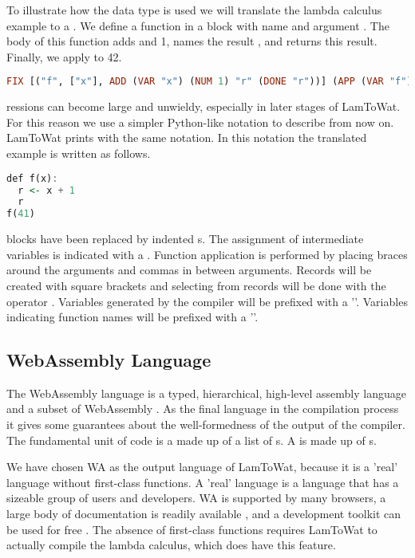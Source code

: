 {To illustrate how the data type is used we will translate the lambda calculus example  to a . We define a function in a  block with name  and argument . The body of this function adds  and 1, names the result , and returns this result. Finally, we apply  to 42.

\begin{lstlisting}[language=Haskell]
  FIX [("f", ["x"], ADD (VAR "x") (NUM 1) "r" (DONE "r"))] (APP (VAR "f") [NUM 41])
\end{lstlisting}

ressions can become large and unwieldy, especially in later stages of LamToWat. For this reason we use a simpler Python-like notation to describe  from now on. LamToWat prints  with the same notation. In this notation the translated example is written as follows.

\begin{lstlisting}[language=Haskell]
def f(x):
  r <- x + 1
  r
f(41)
\end{lstlisting}

 blocks have been replaced by indented s. The assignment of intermediate variables is indicated with a \icode{<-}. Function application is performed by placing braces around the arguments and commas in between arguments. Records will be created with square brackets \icode{[1,2,3]} and selecting from records will be done with the operator \icode{!!}. Variables generated by the compiler will be prefixed with a ''. Variables indicating function names will be prefixed with a '\icode{_}'.

\subsection{\label{subsection:webdata}WebAssembly Language}
The WebAssembly language is a typed, hierarchical, high-level assembly language and a subset of WebAssembly \autocite{webassemblyhomepage}. As the final language in the compilation process it gives some guarantees about the well-formedness of the output of the compiler. The fundamental unit of code is a  made up of a list of s. A  is made up of s.

We have chosen \ac{WA} as the output language of LamToWat, because it is a 'real' language without first-class functions. A 'real' language is a language that has a sizeable group of users and developers. \ac{WA} is supported by many browsers, a large body of documentation is readily available \autocite{webassemblydocs}, and a development toolkit can be used for free \autocite{wabt}. The absence of first-class functions requires LamToWat to actually compile the lambda calculus, which does have this feature. 

}
